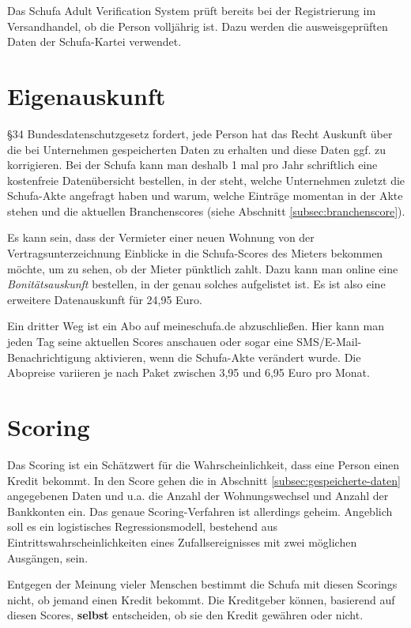 \documentclass[12pt]{article}
\begin{document}
Das Schufa Adult Verification System prüft bereits bei der Registrierung im Versandhandel, ob die Person volljährig ist. Dazu werden die ausweisgeprüften Daten der Schufa-Kartei verwendet.




\section{Eigenauskunft}
§34 Bundesdatenschutzgesetz fordert, jede Person hat das Recht Auskunft über die bei Unternehmen gespeicherten Daten zu erhalten und diese Daten ggf. zu korrigieren.
Bei der Schufa kann man deshalb 1 mal pro Jahr schriftlich eine kostenfreie Datenübersicht bestellen, in der steht, welche Unternehmen zuletzt die Schufa-Akte angefragt haben und warum, welche Einträge momentan 
in der Akte stehen und die aktuellen Branchenscores (siehe Abschnitt \ref{subsec:branchenscore}).

Es kann sein, dass der Vermieter einer neuen Wohnung von der Vertragsunterzeichnung Einblicke in die Schufa-Scores des Mieters bekommen möchte, um zu sehen, ob der Mieter pünktlich zahlt.
Dazu kann man online eine \textit{Bonitätsauskunft} bestellen, in der genau solches aufgelistet ist. Es ist also eine erweitere Datenauskunft für 24,95 Euro.

Ein dritter Weg ist ein Abo auf meineschufa.de abzuschließen. Hier kann man jeden Tag seine aktuellen Scores anschauen oder sogar eine SMS/E-Mail-Benachrichtigung aktivieren, wenn die Schufa-Akte 
verändert wurde.
Die Abopreise variieren je nach Paket zwischen 3,95 und 6,95 Euro pro Monat.






\section{Scoring}
\label{sec:scoring}
Das Scoring ist ein Schätzwert für die Wahrscheinlichkeit, dass eine Person einen Kredit bekommt.
In den Score gehen die in Abschnitt \ref{subsec:gespeicherte-daten} angegebenen Daten und u.a. die Anzahl der Wohnungswechsel und Anzahl der Bankkonten ein.
Das genaue Scoring-Verfahren ist allerdings geheim. Angeblich soll es ein logistisches Regressionsmodell,
bestehend aus Eintrittswahrscheinlichkeiten eines Zufallsereignisses mit zwei möglichen Ausgängen, sein.

Entgegen der Meinung vieler Menschen bestimmt die Schufa mit diesen Scorings nicht, ob jemand einen Kredit bekommt. Die Kreditgeber können, basierend auf diesen Scores, \textbf{selbst}
entscheiden, ob sie den Kredit gewähren oder nicht.
\end{document}
